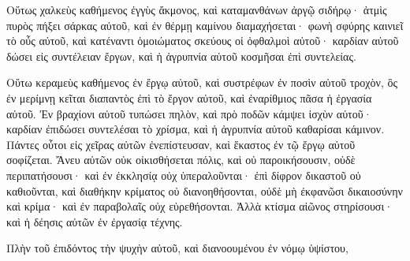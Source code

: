 {\par }{\PP {}Οὕτως χαλκεὺς καθήμενος ἐγγὺς ἄκμονος, καὶ καταμανθάνων ἀργῷ σιδήρῳ· ἀτμὶς πυρὸς πήξει σάρκας αὐτοῦ, καὶ ἐν θέρμῃ καμίνου διαμαχήσεται· φωνὴ σφύρης καινιεῖ τὸ οὖς αὐτοῦ, καὶ κατέναντι ὁμοιώματος σκεύους οἱ ὀφθαλμοὶ αὐτοῦ· καρδίαν αὐτοῦ δώσει εἰς συντέλειαν ἔργων, καὶ ἡ ἀγρυπνία αὐτοῦ κοσμῆσαι ἐπὶ συντελείας.
\par }{\PP {}Οὕτω κεραμεὺς καθήμενος ἐν ἔργῳ αὐτοῦ, καὶ συστρέφων ἐν ποσὶν αὐτοῦ τροχὸν, ὃς ἐν μερίμνῃ κεῖται διαπαντὸς ἐπὶ τὸ ἔργον αὐτοῦ, καὶ ἐναρίθμιος πᾶσα ἡ ἐργασία αὐτοῦ.
Ἐν βραχίονι αὐτοῦ τυπώσει πηλὸν, καὶ πρὸ ποδῶν κάμψει ἰσχὺν αὐτοῦ· καρδίαν ἐπιδώσει συντελέσαι τὸ χρίσμα, καὶ ἡ ἀγρυπνία αὐτοῦ καθαρίσαι κάμινον.
Πάντες οὗτοι εἰς χεῖρας αὐτῶν ἐνεπίστευσαν, καὶ ἕκαστος ἐν τῷ ἔργῳ αὐτοῦ σοφίζεται.
Ἄνευ αὐτῶν οὐκ οἰκισθήσεται πόλις, καὶ οὐ παροικήσουσιν, οὐδὲ περιπατήσουσι·
καὶ ἐν ἐκκλησίᾳ οὐχ ὑπεραλοῦνται· ἐπὶ δίφρον δικαστοῦ οὐ καθιοῦνται, καὶ διαθήκην κρίματος οὐ διανοηθήσονται, οὐδὲ μὴ ἐκφανῶσι δικαιοσύνην καὶ κρίμα· καὶ ἐν παραβολαῖς οὐχ εὑρεθήσονται.
Ἀλλὰ κτίσμα αἰῶνος στηρίσουσι· καὶ ἡ δέησις αὐτῶν ἐν ἐργασίᾳ τέχνης.
\par }{\PP Πλὴν τοῦ ἐπιδόντος τὴν ψυχὴν αὐτοῦ, καὶ διανοουμένου ἐν νόμῳ ὑψίστου,

}

